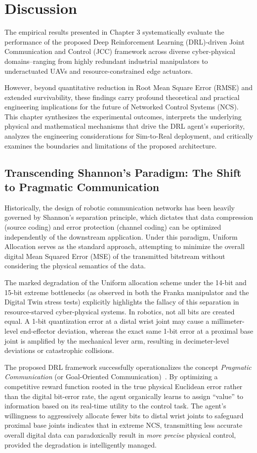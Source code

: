 \section{Discussion}
The empirical results presented in Chapter 3 systematically evaluate the performance of the proposed Deep Reinforcement Learning (DRL)-driven 
Joint Communication and Control (JCC) framework across diverse cyber-physical domains--ranging from highly redundant industrial manipulators to 
underactuated UAVs and resource-constrained edge actuators.

However, beyond quantitative reduction in Root Mean Square Error (RMSE) and extended survivability, these findings carry profound theoretical and 
practical engineering implications for the future of Networked Control Systems (NCS). This chapter synthesizes the experimental 
outcomes, interprets the underlying physical and mathematical mechanisms that drive the DRL agent's superiority, analyzes the engineering considerations 
for Sim-to-Real deployment, and critically examines the boundaries and limitations of the proposed architecture.
\subsection{Transcending Shannon's Paradigm: The Shift to Pragmatic Communication}
Historically, the design of robotic communication networks has been heavily governed by Shannon's separation principle, which dictates 
that data compression (source coding) and error protection (channel coding) can be optimized independently of the downstream application.
Under this paradigm, Uniform Allocation serves as the standard approach, attempting to minimize the overall digital Mean Squared Error (MSE)
of the transmitted bitstream without considering the physical semantics of the data.

The marked degradation of the Uniform allocation scheme under the 14-bit and 15-bit extreme bottlenecks (as observed in both the Franka manipulator and the Digital Twin stress tests) 
explicitly highlights the fallacy of this separation in resource-starved cyber-physical systems. In robotics, not all bits are created equal. 
A 1-bit quantization error at a distal wrist joint may cause a millimeter-level end-effector deviation, whereas the exact same 1-bit error at a proximal base joint is amplified by the mechanical lever arm,
resulting in decimeter-level deviations or catastrophic collisions.

The proposed DRL framework successfully operationalizes the concept \textit{Pragmatic Communication} (or Goal-Oriented Communication)~\cite{SCNS}.
By optimizing a competitive reward function rooted in the true physical Euclidean error rather than the digital bit-error rate, the agent 
organically learns to assign ``value'' to information based on its real-time utility to the control task. The agent's willingness to aggressively allocate fewer bits to distal wrist joints to safeguard proximal base joints indicates that in extreme NCS, transmitting less accurate overall digital data can paradoxically result in \textit{more precise} physical control, 
provided the degradation is intelligently managed.
